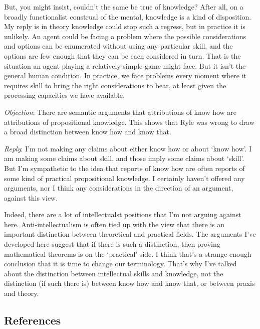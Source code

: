 \documentclass[
  11pt,
  letterpaper,
  DIV=11,
  numbers=noendperiod,
  twoside]{scrartcl}
\begin{document}
But, you might insist, couldn't the same be true of knowledge? After
all, on a broadly functionalist construal of the mental, knowledge is a
kind of disposition. My reply is in theory knowledge could stop such a
regress, but in practice it is unlikely. An agent could be facing a
problem where the possible considerations and options can be enumerated
without using any particular skill, and the options are few enough that
they can be each considered in turn. That is the situation an agent
playing a relatively simple game might face. But it isn't the general
human condition. In practice, we face problems every moment where it
requires skill to bring the right considerations to bear, at least given
the processing capacities we have available.

\emph{Objection}: There are semantic arguments that attributions of know
how are attributions of propositional knowledge. This shows that Ryle
was wrong to draw a broad distinction between know how and know that.

\emph{Reply}: I'm not making any claims about either know how or about
`know how'. I am making some claims about skill, and those imply some
claims about `skill'. But I'm sympathetic to the idea that reports of
know how are often reports of some kind of practical propositional
knowledge. I certainly haven't offered any arguments, nor I think any
considerations in the direction of an argument, against this view.

Indeed, there are a lot of intellectualst positions that I'm not arguing
against here. Anti-intellectualism is often tied up with the view that
there is an important distinction between theoretical and practical
fields. The arguments I've developed here suggest that if there is such
a distinction, then proving mathematical theorems is on the `practical'
side. I think that's a strange enough conclusion that it is time to
change our terminology. That's why I've talked about the distinction
between intellectual skills and knowledge, not the distinction (if such
there is) between know how and know that, or between praxis and theory.

\subsection*{References}\label{references}
\end{document}
